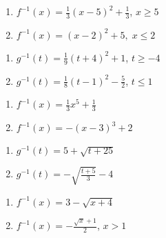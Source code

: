 \documentclass{ximera}
\begin{document}
\begin{multicols}{2}
\begin{enumerate}
\setcounter{enumi}{\value{HW}}


\item $f^{-1}(x) = \frac{1}{3}(x-5)^2+\frac{1}{3}$, $x \geq 5$
\item $f^{-1}(x) = (x - 2)^{2} + 5, \; x \leq 2$

\setcounter{HW}{\value{enumi}}
\end{enumerate}
\end{multicols}

\begin{multicols}{2}
\begin{enumerate}
\setcounter{enumi}{\value{HW}}


\item $g^{-1}(t) = \frac{1}{9}(t+4)^2+1$, $t \geq -4$

\item $g^{-1}(t) = \frac{1}{8}(t-1)^2-\frac{5}{2}$, $t \leq 1$

\setcounter{HW}{\value{enumi}}
\end{enumerate}
\end{multicols}

\begin{multicols}{2}
\begin{enumerate}
\setcounter{enumi}{\value{HW}}

\item $f^{-1}(x) = \frac{1}{3} x^{5} + \frac{1}{3}$
\item $f^{-1}(x) = -(x-3)^3+2$

\setcounter{HW}{\value{enumi}}
\end{enumerate}
\end{multicols}

\begin{multicols}{2}
\begin{enumerate}
\setcounter{enumi}{\value{HW}}

\item $g^{-1}(t) = 5 + \sqrt{t+25}$
\item $g^{-1}(t) = -\sqrt{\frac{t + 5}{3}} - 4$

\setcounter{HW}{\value{enumi}}
\end{enumerate}
\end{multicols}

\begin{multicols}{2}
\begin{enumerate}
\setcounter{enumi}{\value{HW}}

\item $f^{-1}(x) = 3 - \sqrt{x+4}$
\item $f^{-1}(x) =-\frac{\sqrt{x}+1}{2}$, $x > 1$

\setcounter{HW}{\value{enumi}}
\end{enumerate}
\end{multicols}
\end{document}
